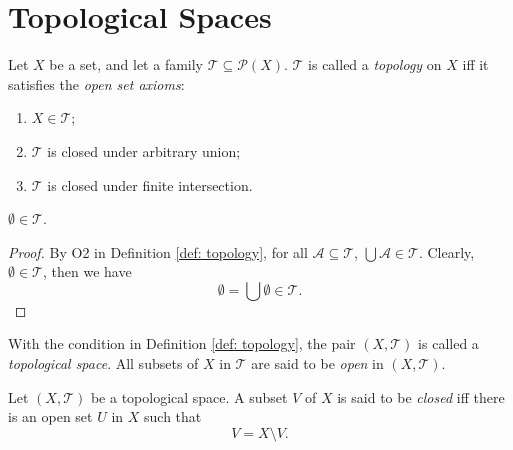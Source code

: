 \section{Topological Spaces}



\begin{definition}
	[topology]
	\label{def: topology}
	Let $X$ be a set, and let a family $\mathcal T \subseteq \mathcal P(X)$. $\mathcal T$ is called a \textit{topology} on $X$ iff it satisfies the \textit{open set axioms}:
	\begin{enumerate}[\bf O1.]
		\item $X \in \mathcal T$;
		\item $\mathcal T$ is closed under arbitrary union;
		\item $\mathcal T$ is closed under finite intersection.
	\end{enumerate}
\end{definition}


\begin{theorem}
	$\emptyset \in \mathcal T$.
	
	\begin{proof}
		By O2 in Definition \ref{def: topology}, for all $\mathcal A \subseteq \mathcal T$, $\bigcup \mathcal A \in \mathcal T$. Clearly, $\emptyset \in \mathcal T$, then we have
		$$
		\emptyset = \bigcup \emptyset \in \mathcal T.
		$$
	\end{proof}
\end{theorem}


\begin{definition}
	\label{def: topological spaces}
	With the condition in Definition \ref{def: topology}, the pair $(X, \mathcal T)$ is called a \textit{topological space}. All subsets of $X$ in $\mathcal T$ are said to be \textit{open} in $(X, \mathcal T)$.
\end{definition}


\begin{definition}
	\label{def: closed sets}
	Let $(X, \mathcal T)$ be a topological space. A subset $V$ of $X$ is said to be \textit{closed} iff there is an open set $U$ in $X$ such that
	$$
	V = X \setminus V.
	$$
\end{definition}


